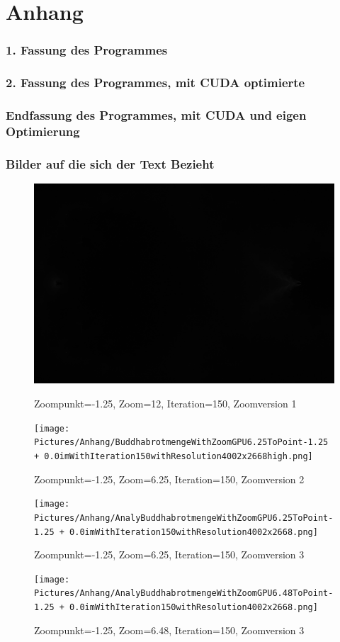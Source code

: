 \section{Anhang}

\subsubsection*{1. Fassung des Programmes}
\bigskip
\subsubsection*{2. Fassung des Programmes, mit CUDA optimierte}
\bigskip
\subsubsection*{Endfassung des Programmes, mit CUDA und eigen Optimierung}

\subsubsection*{Bilder auf die sich der Text Bezieht}
\begin{figure}[h]
    \centering
    \includegraphics[width=.5\textwidth]{Pictures/Anhang/BuddhabrotmengeWithZoom12ToPoint-1.25 + 0.0imWithIteration150withResolution4000x2667.png}
     \label{fig:Version1}
     \caption[Erstes Bild im Anhang (eigenes Bild)]{Zoompunkt=-1.25, Zoom=12, Iteration=150, Zoomversion 1}
\end{figure}
\begin{figure}[h]
    \centering
    \texttt{[image: Pictures/Anhang/BuddhabrotmengeWithZoomGPU6.25ToPoint-1.25 + 0.0imWithIteration150withResolution4002x2668high.png]}
    \label{fig:Version2}
   \caption[Zeites Bild im Anhang (eigenes Bild)]{Zoompunkt=-1.25, Zoom=6.25, Iteration=150, Zoomversion 2}
\end{figure}
\begin{figure}[h]
    \centering
    \texttt{[image: Pictures/Anhang/AnalyBuddhabrotmengeWithZoomGPU6.25ToPoint-1.25 + 0.0imWithIteration150withResolution4002x2668.png]}
    \label{fig:Version3}
   \caption[Drittes Bild im Anhang (eigenes Bild)]{Zoompunkt=-1.25, Zoom=6.25, Iteration=150, Zoomversion 3}
\end{figure}
\begin{figure}[h]
    \centering
    \texttt{[image: Pictures/Anhang/AnalyBuddhabrotmengeWithZoomGPU6.48ToPoint-1.25 + 0.0imWithIteration150withResolution4002x2668.png]}
    \label{fig:Version4}
    \caption[Viertes Bild im Anhang (eigenes Bild)]{Zoompunkt=-1.25, Zoom=6.48, Iteration=150, Zoomversion 3}
\end{figure}

